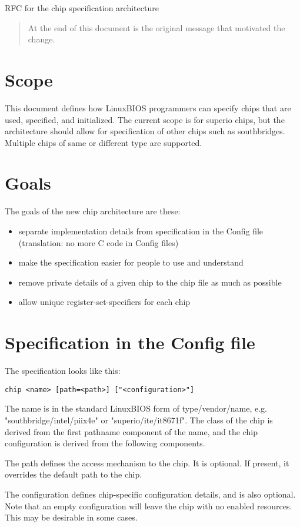 		RFC for the chip specification architecture

\begin{abstract}
At the end of this document is the original message that motivated the
change.
\end{abstract}

\section{Scope}
This document defines how LinuxBIOS programmers can specify chips that
are used, specified, and initialized. The current scope is for superio
chips, but the architecture should allow for specification of other chips such
as southbridges. Multiple chips of same or different type are supported.

\section{Goals}
The goals of the new chip architecture are these:
\begin{itemize}
\item separate implementation details from specification in the Config file
(translation: no more C code in Config files)
\item make the specification easier for people to use and understand
\item remove private details of a given chip to the chip file as much
as possible
\item allow unique register-set-specifiers for each chip
\end{itemize}

\section{Specification in the Config file}
The specification looks like this:
\begin{verbatim}
chip <name> [path=<path>] ["<configuration>"]
\end{verbatim}
The name is in the standard LinuxBIOS form of type/vendor/name, e.g.
"southbridge/intel/piix4e" or "superio/ite/it8671f". The class of the
chip is derived from the first pathname component of the name, and the chip
configuration is derived from the following components.

The path defines the access mechanism to the chip.
It is optional. If present, it overrides the default path to the chip.

The configuration defines chip-specific configuration details, and is also
optional. Note that an empty configuration will leave the chip with
no enabled resources. This may be desirable in some cases.

